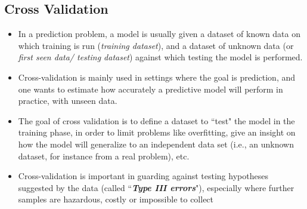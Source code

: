 \documentclass[a4paper,12pt]{article}
\begin{document}




\subsection{Cross Validation}
\begin{itemize}
	\item In a prediction problem, a model is usually given a dataset of known data 
	on which training is run (\textit{training dataset}), and a dataset of unknown data (or \textit{first seen data/ testing dataset}) against which testing the model is performed.
	\item Cross-validation is mainly used in settings where the goal is prediction, and one wants to estimate how accurately a predictive model will perform in practice, with unseen data.
	\item The goal of cross validation is to define a dataset to ``test" the model in the training phase, in order to limit problems like overfitting, give an insight on how the model will generalize to an independent data set (i.e., an unknown dataset, for instance from a real problem), etc.
	\item Cross-validation is important in guarding against testing hypotheses suggested by the data (called ``\textbf{\textit{Type III errors}}"), especially where further samples 
	are hazardous, costly or impossible to collect 
\end{itemize}
\end{document}

